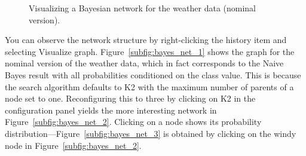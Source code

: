 \begin{figure}[!th]
\centering
{}
\qquad
{}
\newline
{}
\caption{\label{fig:weather}Visualizing a Bayesian network for the weather data (nominal version).}
\end{figure}

You can observe the network structure by right-clicking the history
item and selecting Visualize graph. Figure~\ref{subfig:bayes_net_1}
shows the graph for the nominal version of the weather data, which in
fact corresponds to the Naive Bayes result with all probabilities
conditioned on the class value. This is because the search algorithm
defaults to K2 with the maximum number of parents of a node set to
one. Reconfiguring this to three by clicking on K2 in the
configuration panel yields the more interesting network in
Figure~\ref{subfig:bayes_net_2}. Clicking on a node shows its
probability distribution—Figure~\ref{subfig:bayes_net_3} is obtained
by clicking on the windy node in Figure~\ref{subfig:bayes_net_2}.

